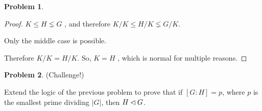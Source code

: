 \documentclass[12pt]{article}
\theoremstyle{definition} %
\newtheorem{problem}{Problem}
\begin{document}
\begin{problem}
\begin{proof}
    $K\leq H\lneq G$ , and therefore $K/K\leq H/K\lneq G/K$. 

    Only the middle case is possible. 

    Therefore $K/K = H/K$.  So, $K = H$ , which is normal for multiple reasons. 
  \end{proof} 
\end{problem}

\begin{problem} (Challenge!)

  Extend the logic of the previous problem to prove that if $[G:H] = p$, where $p$ is the smallest prime dividing $|G|$, then $H \lhd G$.  
\end{problem}
\end{document}
